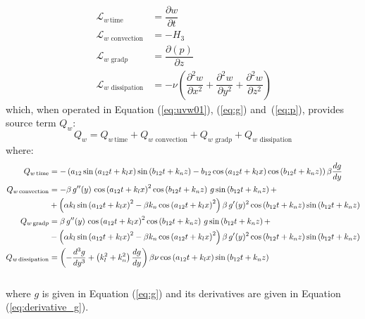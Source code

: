 \documentclass[10pt]{article}
\newcommand{\Diff}[2] {\dfrac{\partial( #1)}{\partial #2}}
\newcommand{\diff}[2] {\dfrac{\partial #1}{\partial #2}}
\newcommand{\Lo}{\,\mathcal{L}}
\newcommand{\convection}{\,\text{convection}}
\newcommand{\gradp}{\,\text{grad}p}
\newcommand{\dissipation}{\,\text{dissipation}}
\begin{document}
\begin{equation}
 \begin{split}
\Lo_{w \, \text{time}}&= \diff{w}{t}  \\
\Lo_{w \, \convection}&= -H_3\\
\Lo_{w \, \gradp }&= \Diff{p}{z}\\
\Lo_{w \, \dissipation }&= - \nu\left(\diff{^2 w}{ x^2}+\diff{^2 w}{ y^2}+\diff{^2 w}{ z^2} \right)
 \end{split}
\end{equation}
%
which, when operated in Equation (\ref{eq:uvw01}),  (\ref{eq:g}) and~(\ref{eq:p}), provides source term $Q_{w}$:
\begin{equation*} 
Q_w = Q_{w \, \text{time}}+Q_{w \, \convection}+Q_{w \, \gradp }+Q_{w \, \dissipation }
\end{equation*}
where:
\begin{equation*}
\begin{split}
Q_{w \,\text{time}} &=-\left(a_{12} \sin\left(a_{12} t+k_l x\right) \sin\left(b_{12} t+k_n z\right)-b_{12} \cos\left(a_{12} t+k_l x\right) \cos\left(b_{12} t+k_n z\right)\right) \beta \frac{dg}{dy}\\
%
 Q_{w \convection} &= -\beta \, g''(y) \, \cos\left(a_{12} t+k_l x\right)^2 \cos\left(b_{12} t+k_n z\right) \, g \sin\left(b_{12} t+k_n z\right)+ \\
	&+\left(\alpha k_l \sin\left(a_{12} t+k_l x\right)^2-\beta k_n \cos\left(a_{12} t+k_l x\right)^2\right) \beta \, g'(y)^2 \cos\left(b_{12} t+k_n z\right) \sin\left(b_{12} t+k_n z\right)\\
%
Q_{w \gradp} &=\beta \, g''(y) \, \cos\left(a_{12} t+k_l x\right)^2 \cos\left(b_{12} t+k_n z\right) \, g \sin\left(b_{12} t+k_n z\right)+ \\
	&-\left(\alpha k_l \sin\left(a_{12} t+k_l x\right)^2-\beta k_n \cos\left(a_{12} t+k_l x\right)^2\right) \beta \, g'(y)^2 \cos\left(b_{12} t+k_n z\right) \sin\left(b_{12} t+k_n z\right)\\
%
 Q_{w \dissipation} &=\left(-\dfrac{d^3g}{dy^3}+\left(k_l^2+k_n^2\right) \frac{dg}{dy}\right) \beta \nu \cos\left(a_{12} t+k_l x\right) \sin\left(b_{12} t+k_n z\right)\\\vspace{8pt}
\end{split}
\end{equation*}
where $g$ is given in Equation (\ref{eq:g}) and its derivatives are given in Equation (\ref{eq:derivative_g}).


% 
% 
\end{document}
